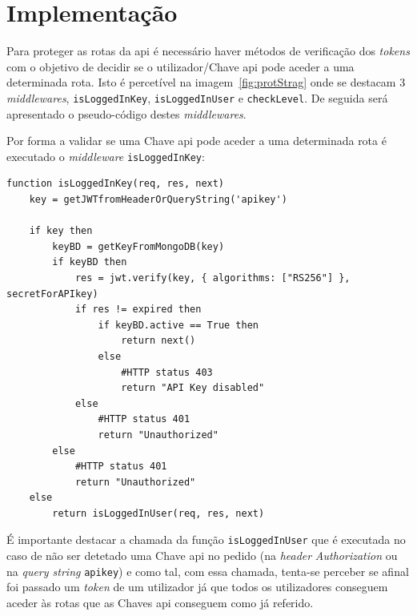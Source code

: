 \section{Implementação}

Para proteger as rotas da \acrshort{api} é necessário haver métodos de verificação dos \textit{tokens} com o objetivo de decidir se o utilizador/Chave \acrshort{api} pode aceder a uma determinada rota. Isto é percetível na imagem~\ref{fig:protStrag} onde se destacam 3 \textit{middlewares}, \texttt{isLoggedInKey}, \texttt{isLoggedInUser} e \texttt{checkLevel}. De seguida será apresentado o pseudo-código destes \textit{middlewares}. 

Por forma a validar se uma Chave \acrshort{api} pode aceder a uma determinada rota é executado o \textit{middleware} \texttt{isLoggedInKey}:
\begin{lstlisting}[language=pseudocode, caption=Verificação se um pedido com uma determinada Chave \acrshort{api} pode ser efetuado]
function isLoggedInKey(req, res, next)
    key = getJWTfromHeaderOrQueryString('apikey')

    if key then
        keyBD = getKeyFromMongoDB(key)
        if keyBD then
            res = jwt.verify(key, { algorithms: ["RS256"] }, secretForAPIkey)
            if res != expired then
                if keyBD.active == True then
                    return next()
                else
                    #HTTP status 403
                    return "API Key disabled"
            else
                #HTTP status 401
                return "Unauthorized"
        else
            #HTTP status 401
            return "Unauthorized"
    else
        return isLoggedInUser(req, res, next)
\end{lstlisting}
É importante destacar a chamada da função \texttt{isLoggedInUser} que é executada no caso de não ser detetado uma Chave \acrshort{api} no pedido (na \textit{header} \textit{Authorization} ou na \textit{query string} \texttt{apikey}) e como tal, com essa chamada, tenta-se perceber se afinal foi passado um \textit{token} de um utilizador já que todos os utilizadores conseguem aceder às rotas que as Chaves \acrshort{api} conseguem como já referido.


